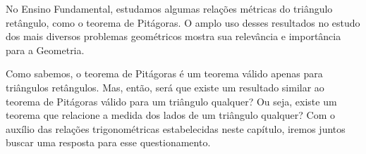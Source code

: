 \label{exp_estendenoteopitagoras}


No Ensino Fundamental, estudamos algumas relações métricas do triângulo retângulo, como o teorema de Pitágoras. 
%
O amplo uso desses resultados no estudo dos mais diversos problemas geométricos mostra sua relevância e importância para a Geometria.

Como sabemos, o teorema de Pitágoras é um teorema válido apenas para triângulos retângulos. 
%
Mas, então, será que existe um resultado similar ao teorema de Pitágoras válido para um triângulo qualquer? 
%
Ou seja, existe um teorema que relacione a medida dos lados de um triângulo qualquer? 
%
Com o auxílio das relações trigonométricas estabelecidas neste capítulo, iremos juntos buscar uma resposta para esse questionamento.


